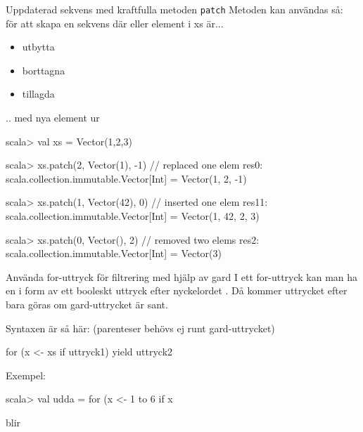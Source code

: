 \begin{Slide}{Uppdaterad sekvens med kraftfulla metoden \texttt{patch}}
  Metoden  kan användas så:  \\för att skapa en  sekvens där  eller  element i xs är...  
  \begin{itemize}
    \item utbytta 
    \item borttagna 
    \item tillagda 
  \end{itemize}
  .. med nya element ur  
\begin{REPL}
scala> val xs = Vector(1,2,3)

scala> xs.patch(2, Vector(1), -1)     // replaced one elem
res0: scala.collection.immutable.Vector[Int] = Vector(1, 2, -1)

scala> xs.patch(1, Vector(42), 0)     // inserted one elem
res11: scala.collection.immutable.Vector[Int] = Vector(1, 42, 2, 3)

scala> xs.patch(0, Vector(), 2)       // removed two elems
res2: scala.collection.immutable.Vector[Int] = Vector(3)
 
\end{REPL}
\end{Slide}

\begin{Slide}{Använda for-uttryck för filtrering med hjälp av gard}
I ett for-uttryck kan man ha en   i form av ett booleskt uttryck efter nyckelordet . Då kommer uttrycket efter  bara göras om gard-uttrycket är sant.

\vspace{1em}

Syntaxen är så här: (parenteser behövs ej runt gard-uttrycket)
\begin{Code}[basicstyle=\ttfamily\SlideFontSize{12}{14}]
for (x <- xs if uttryck1) yield uttryck2
\end{Code}
\pause
Exempel:
\begin{REPLnonum}
scala> val udda = for (x <- 1 to 6 if x %
\end{REPLnonum}
\pause
{} blir 
\end{Slide}


